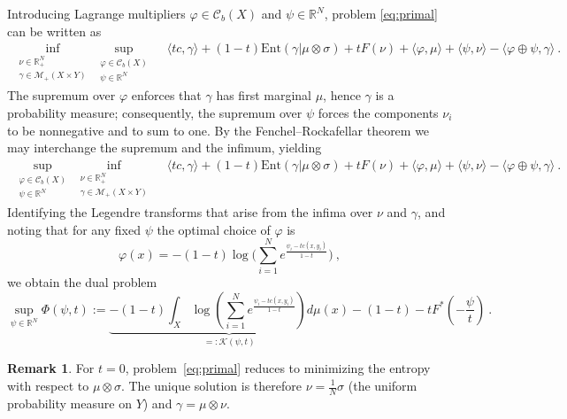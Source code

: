 \documentclass{scrartcl}
\newcommand{\R}{{\mathbb R}}
\theoremstyle{plain}
\theoremstyle{definition}
\newtheorem{rem}[thm]{Remark}
\begin{document}
Introducing Lagrange multipliers $\varphi\in \mathcal{C}_b(X)$ and $\psi\in\R^N$, problem \eqref{eq:primal} can be written as
\begin{align*}
    \inf_{\substack{\nu\in\R^{N}_{ +} \\ \gamma\in\mathcal{M}_+(X\times Y)}} \sup_{\substack{\varphi\in \mathcal{C}_b(X) \\ \psi\in\R^N}}\quad \langle tc, \gamma \rangle + (1-t)\mathrm{Ent}(\gamma|\mu\otimes\sigma) + tF(\nu) + \langle \varphi, \mu\rangle + \langle \psi, \nu\rangle - \langle \varphi\oplus\psi, \gamma\rangle\ .
\end{align*}
The supremum over $\varphi$ enforces that $\gamma$ has first marginal $\mu$, hence $\gamma$ is a probability measure; consequently, the supremum over $\psi$ forces the components $\nu_i$ to be nonnegative and to sum to one. By the Fenchel--Rockafellar theorem we may interchange the supremum and the infimum, yielding
\begin{align*}
    \sup_{\substack{ \varphi\in \mathcal{C}_b(X) \\ \psi\in\R^N}} \inf_{ \substack{\nu\in\R^N_{ +} \\ \gamma\in\mathcal{M}_+(X\times Y)}} \quad \langle tc,\gamma \rangle + (1-t)\mathrm{Ent}(\gamma|\mu\otimes\sigma) + tF(\nu) + \langle \varphi, \mu\rangle + \langle \psi, \nu\rangle - \langle \varphi\oplus\psi, \gamma\rangle\ .
\end{align*}
Identifying the Legendre transforms that arise from the infima over $\nu$ and $\gamma$, and noting that for any fixed $\psi$ the optimal choice of $\varphi$ is
\[
    \varphi(x)=-(1-t)\log\!\Big( \sum_{i=1}^N e^{ \frac{\psi_i-tc(x,y_i)}{1-t}}\Big)\ ,
\]
we obtain the dual problem
\begin{equation} \label{eq:dual}
    \sup_{\psi\in\R^N} \Phi(\psi,t):= \underbrace{-(1-t)\int_X \log\left( \sum_{i=1}^N e^{ \frac{\psi_i-tc(x,y_i)}{1-t} }\right) d\mu(x)}_{=:\mathcal{K}(\psi,t)} -(1-t) -tF^*\left(-\frac{\psi}{t}\right)\ .
\end{equation}

\begin{rem}
    For $t=0$, problem~\eqref{eq:primal} reduces to minimizing the entropy with respect to $\mu\otimes\sigma$. The unique solution is therefore $\nu=\tfrac1N\sigma$ (the uniform probability measure on $Y$) and $\gamma=\mu\otimes\nu$.
\end{rem}
\end{document}
